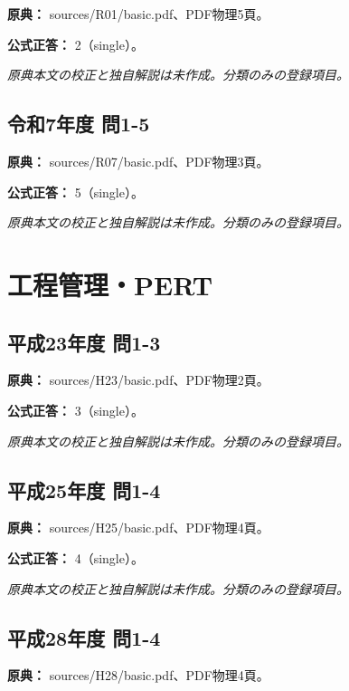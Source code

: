 \noindent\textbf{原典：} sources/R01/basic.pdf、PDF物理5頁。

\textbf{公式正答：} 2（single）。

\par\textit{原典本文の校正と独自解説は未作成。分類のみの登録項目。}

\subsection{令和7年度 問1-5}
\label{q:r07-reg-basic-1-5}

\noindent\textbf{原典：} sources/R07/basic.pdf、PDF物理3頁。

\textbf{公式正答：} 5（single）。

\par\textit{原典本文の校正と独自解説は未作成。分類のみの登録項目。}

\section{工程管理・PERT}

\subsection{平成23年度 問1-3}
\label{q:h23-reg-basic-1-3}

\noindent\textbf{原典：} sources/H23/basic.pdf、PDF物理2頁。

\textbf{公式正答：} 3（single）。

\par\textit{原典本文の校正と独自解説は未作成。分類のみの登録項目。}

\subsection{平成25年度 問1-4}
\label{q:h25-reg-basic-1-4}

\noindent\textbf{原典：} sources/H25/basic.pdf、PDF物理4頁。

\textbf{公式正答：} 4（single）。

\par\textit{原典本文の校正と独自解説は未作成。分類のみの登録項目。}

\subsection{平成28年度 問1-4}
\label{q:h28-reg-basic-1-4}

\noindent\textbf{原典：} sources/H28/basic.pdf、PDF物理4頁。

